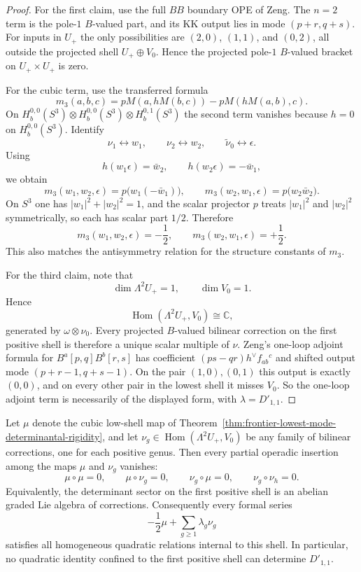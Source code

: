 \begin{proof}
For the first claim, use the full $BB$ boundary OPE of Zeng.
The $n=2$ term is the pole-$1$ $B$-valued part, and its KK output lies in
mode $(p+r,q+s)$.
For inputs in $U_+$ the only possibilities are
$(2,0)$, $(1,1)$, and $(0,2)$, all outside the projected shell
$U_+\oplus V_0$.
Hence the projected pole-$1$ $B$-valued bracket on $U_+\times U_+$ is zero.

For the cubic term, use the transferred formula
\[
m_3(a,b,c)=pM(a,hM(b,c))-pM(hM(a,b),c).
\]
On $H_b^{0,0}(S^3)\otimes H_b^{0,0}(S^3)\otimes H_b^{0,1}(S^3)$ the second
term vanishes because $h=0$ on $H_b^{0,0}(S^3)$.
Identify
\[
\nu_1\leftrightarrow w_1,
\qquad
\nu_2\leftrightarrow w_2,
\qquad
\widetilde\nu_0\leftrightarrow \epsilon.
\]
Using
\[
h(w_1\epsilon)=\bar w_2,
\qquad
h(w_2\epsilon)=-\bar w_1,
\]
we obtain
\[
m_3(w_1,w_2,\epsilon)=p\bigl(w_1(-\bar w_1)\bigr),
\qquad
m_3(w_2,w_1,\epsilon)=p\bigl(w_2\bar w_2\bigr).
\]
On $S^3$ one has $|w_1|^2+|w_2|^2=1$, and the scalar projector $p$ treats
$|w_1|^2$ and $|w_2|^2$ symmetrically, so each has scalar part $1/2$.
Therefore
\[
m_3(w_1,w_2,\epsilon)=-\frac12,
\qquad
m_3(w_2,w_1,\epsilon)=+\frac12.
\]
This also matches the antisymmetry relation for the structure constants of
$m_3$.

For the third claim, note that
\[
\dim \Lambda^2U_+=1,
\qquad
\dim V_0=1.
\]
Hence
\[
\operatorname{Hom}(\Lambda^2U_+,V_0)\cong \mathbb C,
\]
generated by $\omega\otimes \nu_0$.
Every projected $B$-valued bilinear correction on the first positive shell
is therefore a unique scalar multiple of $\nu$.
Zeng's one-loop adjoint formula for $B^a[p,q]B^b[r,s]$ has coefficient
$(ps-qr)h^\vee f_{ab}{}^c$ and shifted output mode
$(p+r-1,q+s-1)$.
On the pair $(1,0),(0,1)$ this output is exactly $(0,0)$, and on every
other pair in the lowest shell it misses $V_0$.
So the one-loop adjoint term is necessarily of the displayed form, with
$\lambda=D'_{1,1}$.
\end{proof}

\begin{proposition}
\label{prop:frontier-positive-shell-determinantal-extinction}
Let $\mu$ denote the cubic low-shell map of
Theorem~\ref{thm:frontier-lowest-mode-determinantal-rigidity}, and let
$\nu_g\in \operatorname{Hom}(\Lambda^2U_+,V_0)$ be any family of bilinear
corrections, one for each positive genus.
Then every partial operadic insertion among the maps $\mu$ and $\nu_g$
vanishes:
\[
\mu\circ \mu = 0,
\qquad
\mu\circ \nu_g = 0,
\qquad
\nu_g\circ \mu = 0,
\qquad
\nu_g\circ \nu_h = 0.
\]
Equivalently, the determinant sector on the first positive shell is an
abelian graded Lie algebra of corrections.
Consequently every formal series
\[
-\frac12\mu + \sum_{g\ge 1}\lambda_g\nu_g
\]
satisfies all homogeneous quadratic relations internal to this shell.
In particular, no quadratic identity confined to the first positive shell
can determine $D'_{1,1}$.
\end{proposition}

